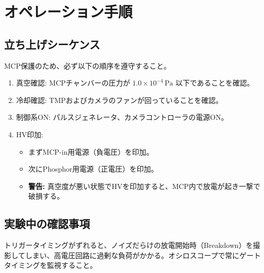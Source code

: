 \section{オペレーション手順}

\subsection{立ち上げシーケンス}
MCP保護のため、必ず以下の順序を遵守すること。
\begin{enumerate}
    \item 真空確認: MCPチャンバーの圧力が $1.0 \times 10^{-4}\,\mathrm{Pa}$ 以下であることを確認。
    \item 冷却確認: TMPおよびカメラのファンが回っていることを確認。
    \item 制御系ON: パルスジェネレータ、カメラコントローラの電源ON。
    \item HV印加: \begin{itemize}
        \item まずMCP-in用電源（負電圧）を印加。
        \item 次にPhosphor用電源（正電圧）を印加。
        \item \textbf{警告:} 真空度が悪い状態でHVを印加すると、MCP内で放電が起き一撃で破損する。
    \end{itemize}
\end{enumerate}

\subsection{実験中の確認事項}
トリガータイミングがずれると、ノイズだらけの放電開始時（Breakdown）を撮影してしまい、高電圧回路に過剰な負荷がかかる。オシロスコープで常にゲートタイミングを監視すること。